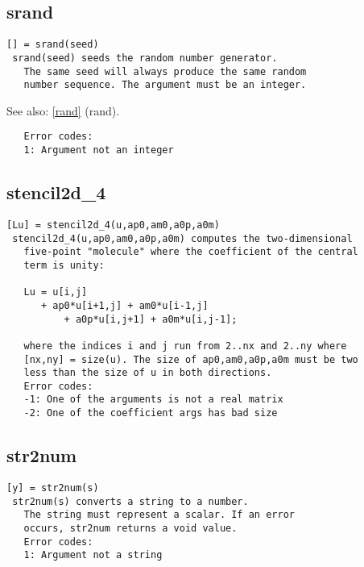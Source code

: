 \documentclass[a4paper]{article}
\begin{document}
\subsection{srand\label{srand}}

\begin{tscreen}
\begin{verbatim}
[] = srand(seed)
 srand(seed) seeds the random number generator.
   The same seed will always produce the same random
   number sequence. The argument must be an integer.
\end{verbatim}

See also: \ref{rand} {(rand)}.
\begin{verbatim}
   Error codes:
   1: Argument not an integer 
\end{verbatim}
\end{tscreen}





\subsection{stencil2d\_4\label{stencil2d_4}}

\begin{tscreen}
\begin{verbatim}
[Lu] = stencil2d_4(u,ap0,am0,a0p,a0m)
 stencil2d_4(u,ap0,am0,a0p,a0m) computes the two-dimensional
   five-point "molecule" where the coefficient of the central
   term is unity:

   Lu = u[i,j]
      + ap0*u[i+1,j] + am0*u[i-1,j]
          + a0p*u[i,j+1] + a0m*u[i,j-1];

   where the indices i and j run from 2..nx and 2..ny where
   [nx,ny] = size(u). The size of ap0,am0,a0p,a0m must be two
   less than the size of u in both directions.
   Error codes:
   -1: One of the arguments is not a real matrix
   -2: One of the coefficient args has bad size
\end{verbatim}
\end{tscreen}





\subsection{str2num\label{str2num}}

\begin{tscreen}
\begin{verbatim}
[y] = str2num(s)
 str2num(s) converts a string to a number.
   The string must represent a scalar. If an error
   occurs, str2num returns a void value.
   Error codes:
   1: Argument not a string 
\end{verbatim}
\end{tscreen}
\end{document}
